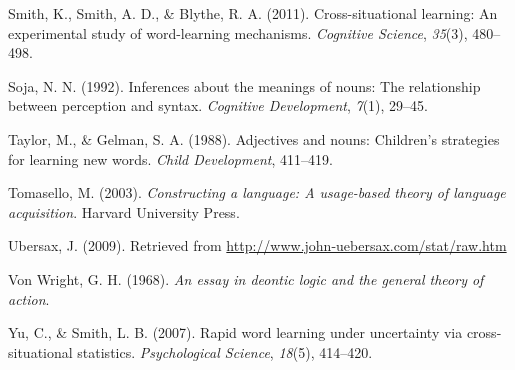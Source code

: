\documentclass[
  ,man,floatsintext]{apa6}
\newlength{\cslhangindent}
\newlength{\cslentryspacingunit} %
\newenvironment{CSLReferences}[2] %
 {%
  \setlength{\parindent}{0pt}
  \ifodd #1
  \let\oldpar\par
  \def\par{\hangindent=\cslhangindent\oldpar}
  \fi
  \setlength{\parskip}{#2\cslentryspacingunit}
 }%
 {}
\begin{document}
\begin{CSLReferences}{1}{0}
\leavevmode{}%
Smith, K., Smith, A. D., \& Blythe, R. A. (2011). Cross-situational learning: An experimental study of word-learning mechanisms. \emph{Cognitive Science}, \emph{35}(3), 480--498.

\leavevmode{}%
Soja, N. N. (1992). Inferences about the meanings of nouns: The relationship between perception and syntax. \emph{Cognitive Development}, \emph{7}(1), 29--45.

\leavevmode{}%
Taylor, M., \& Gelman, S. A. (1988). Adjectives and nouns: Children's strategies for learning new words. \emph{Child Development}, 411--419.

\leavevmode{}%
Tomasello, M. (2003). \emph{Constructing a language: A usage-based theory of language acquisition}. Harvard University Press.

\leavevmode{}%
Ubersax, J. (2009). Retrieved from \url{http://www.john-uebersax.com/stat/raw.htm}

\leavevmode{}%
Von Wright, G. H. (1968). \emph{An essay in deontic logic and the general theory of action}.

\leavevmode{}%
Yu, C., \& Smith, L. B. (2007). Rapid word learning under uncertainty via cross-situational statistics. \emph{Psychological Science}, \emph{18}(5), 414--420.

\end{CSLReferences}
\end{document}
